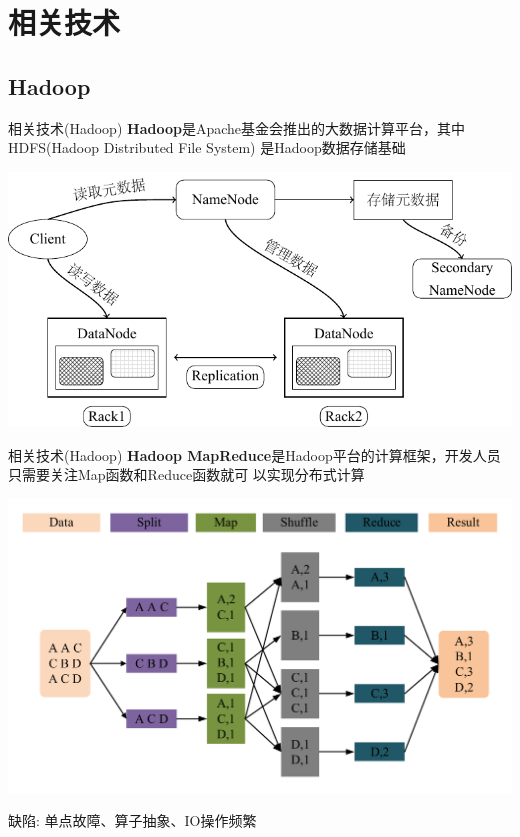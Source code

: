\section{相关技术}

\subsection{Hadoop}

\begin{frame}[t]{相关技术(Hadoop)}
    \textbf{Hadoop}是Apache基金会推出的大数据计算平台，其中HDFS(Hadoop Distributed File System)
    是Hadoop数据存储基础

    \pause
    \includegraphics[scale=0.8]{figures/hdfs.pdf}
\end{frame}

\begin{frame}[t]{相关技术(Hadoop)}
    \textbf{Hadoop MapReduce}是Hadoop平台的计算框架，开发人员只需要关注Map函数和Reduce函数就可
    以实现分布式计算

    \pause
    \includegraphics[scale=0.4]{figures/mapreduce.pdf}

    \pause
    \vspace{-1em}
    \begin{center}
    \alert{缺陷: }单点故障、算子抽象、IO操作频繁
    \end{center} 
\end{frame}

